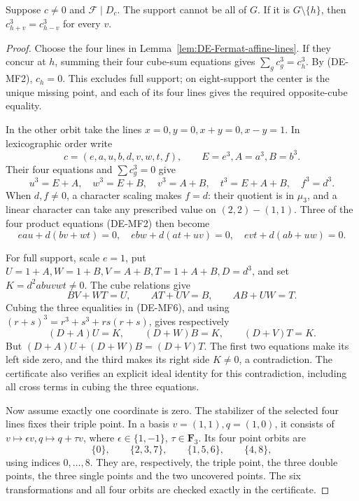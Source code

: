 \begin{lemma}
\label{lem:DE-Fermat-full-and-eight}
Suppose \(c\ne0\) and \(\mathcal F\mid D_c\).
The support cannot be all of \(G\). If it is
\(G\setminus\{h\}\), then
\(c_{h+v}^3=c_{h-v}^3\) for every \(v\).
\end{lemma}
\begin{proof}
Choose the four lines in Lemma~\ref{lem:DE-Fermat-affine-lines}.
If they concur at \(h\), summing their four cube-sum equations
gives \(\sum_gc_g^3=c_h^3\). By (DE-MF2), \(c_h=0\).
This excludes full support; on eight-support the center is
the unique missing point, and each of its four lines gives
the required opposite-cube equality.

In the other orbit take the lines
\(x=0,y=0,x+y=0,x-y=1\). In lexicographic order write
\[
 c=(e,a,u,b,d,v,w,t,f),\qquad E=e^3, A=a^3, B=b^3.
\]
Their four equations and \(\sum c_g^3=0\) give
\[
 u^3=E+A,\quad w^3=E+B,\quad v^3=A+B,\quad
 t^3=E+A+B,\quad f^3=d^3.                           \tag{DE-MF5}
\]
When \(d,f\ne0\), a character scaling makes \(f=d\):
their quotient is in \(\mu_3\), and a linear character can
take any prescribed value on \((2,2)-(1,1)\).
Three of the four product equations (DE-MF2) then become
\[
 eau+d(bv+wt)=0,\quad ebw+d(at+uv)=0,\quad
 evt+d(ab+uw)=0.                                    \tag{DE-MF6}
\]

For full support, scale \(e=1\), put
\(U=1+A,W=1+B,V=A+B,T=1+A+B,D=d^3\), and set
\(K=d^2abuvwt\ne0\). The cube relations give
\[
 BV+WT=U,\qquad AT+UV=B,\qquad AB+UW=T.
\]
Cubing the three equalities in (DE-MF6), and using
\((r+s)^3=r^3+s^3+rs(r+s)\), gives respectively
\[
             (D+A)U=K,\qquad(D+W)B=K,\qquad(D+V)T=K.
 \tag{DE-MF7}
\]
But \((D+A)U+(D+W)B=(D+V)T\). The first two equations
make its left side zero, and the third makes its right side
\(K\ne0\), a contradiction. The certificate also verifies
an explicit ideal identity for this contradiction, including
all cross terms in cubing the three equations.

Now assume exactly one coordinate is zero. The stabilizer of
the selected four lines fixes their triple point. In a basis
\(v=(1,1),q=(1,0)\), it consists of
\(v\mapsto\epsilon v,q\mapsto q+\tau v\), where
\(\epsilon\in\{1,-1\}\), \(\tau\in\mathbf F_3\).
Its four point orbits are
\[
 \{0\},\qquad\{2,3,7\},\qquad\{1,5,6\},\qquad\{4,8\},
 \tag{DE-MF8}
\]
using indices \(0,\ldots,8\). They are, respectively, the
triple point, the three double points, the three single
points and the two uncovered points. The six transformations
and all four orbits are checked exactly in the certificate.


\end{proof}
